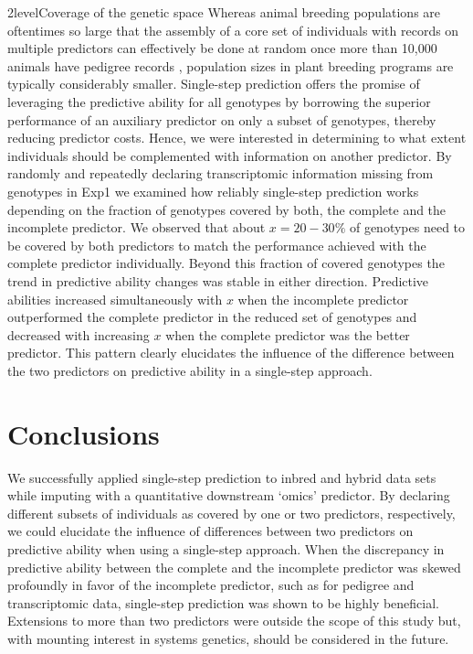 \documentclass[12pt,titlepage]{article}
\begin{document}
\Genetics2level{Coverage of the genetic space}
Whereas animal breeding populations are oftentimes so large that the assembly 
of a core set of individuals with records on multiple predictors can effectively 
be done at random once more than 10,000 animals have pedigree records 
\cite{Fragomeni2015,Lourenco2015,Masuda2016}, population sizes in plant breeding 
programs are typically considerably smaller.
Single-step prediction offers the promise of leveraging the predictive ability
for all genotypes by borrowing the superior performance of an auxiliary
predictor on only a subset of genotypes, thereby reducing predictor costs.
Hence, we were interested in determining to what extent individuals should be 
complemented with information on another predictor.
By randomly and repeatedly declaring transcriptomic information missing from
genotypes in Exp1 we examined how reliably single-step prediction works
depending on the fraction of genotypes covered by both, the complete and the
incomplete predictor.
We observed that about $x=20-30\%$ of genotypes need to be covered by both
predictors to match the performance achieved with the complete predictor
individually.
Beyond this fraction of covered genotypes the trend in predictive ability
changes was stable in either direction.
Predictive abilities increased simultaneously with $x$ when the incomplete
predictor outperformed the complete predictor in the reduced set of genotypes
and decreased with increasing $x$ when the complete predictor was the better
predictor.
This pattern clearly elucidates the influence of the difference between the
two predictors on predictive ability in a single-step approach.



\section*{Conclusions}
We successfully applied single-step prediction to inbred and hybrid data sets
while imputing with a quantitative downstream `omics' predictor.
By declaring different subsets of individuals as covered by one or two 
predictors, respectively, we could elucidate the influence of differences
between two predictors on predictive ability when using a single-step
approach.
When the discrepancy in predictive ability between the complete and the
incomplete predictor was skewed profoundly in favor of the incomplete predictor,
such as for pedigree and transcriptomic data, single-step prediction was shown
to be highly beneficial.
Extensions to more than two predictors were outside the scope of this study
but, with mounting interest in systems genetics, should be considered in the
future.
\end{document}
